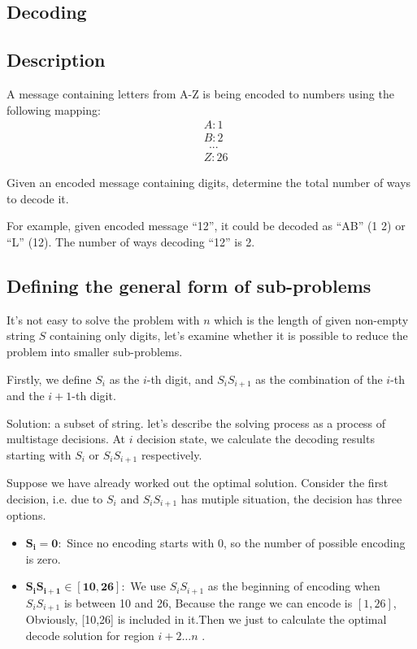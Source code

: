 \documentclass[UTF8,a4paper,12pt]{article}
\begin{document}
\begin{CJK}{UTF8}{gkai}
	\newpage
	\section{Decoding}
	\subsection{Description}
		A message containing letters from A-Z is being encoded to numbers using the following mapping:
		\begin{align*}
			& A:1\\
			& B:2\\
			& \  \ ...\\ 
			& Z : 26
		\end{align*}
		
		Given an encoded message containing digits, determine the total number of ways to decode it.
		
		For example, given encoded message “12”, it could be decoded as “AB” (1 2) or “L” (12). The number of ways decoding “12” is 2.	
	
	\subsection{Defining the general form of sub-problems}
	
		It's not easy to solve the problem with $ n $ which is the length of given non-empty string $ S $ containing only digits, let's examine whether it is possible to reduce the problem into smaller sub-problems.
	
		Firstly, we define $ S_{i} $ as the $ i $-th digit, and $ S_{i}S_{i+1} $ as the combination of the $ i $-th and the $ i+1$-th digit.
	
		Solution: a subset of string. let's describe the solving process as a process of multistage decisions. At $ i $ decision state, we calculate the decoding results starting with $ S_{i} $ or $ S_{i}S_{i+1} $ respectively.
	
		Suppose we have already worked out the optimal solution. Consider the first decision, i.e. due to $ S_{i} $ and $ S_{i}S_{i+1}$ has mutiple situation, the decision has three options.
	
		\begin{itemize}
			\item $\bm{ S_{i} = 0 :}$ Since no encoding starts with 0, so the number of possible encoding is zero.
			
			\item $\bm{  S_{i}S_{i+1} \in [10,26] :}$ We use $ S_{i}S_{i+1} $ as the beginning of encoding when $ S_{i}S_{i+1} $ is between 10 and 26, Because the range we can encode is $ [1,26] $, Obviously, [10,26] is included in it.Then we just to calculate the optimal decode solution for region $ i+2 \dots n $ .
			

\end{itemize}
\end{CJK}
\end{document}
